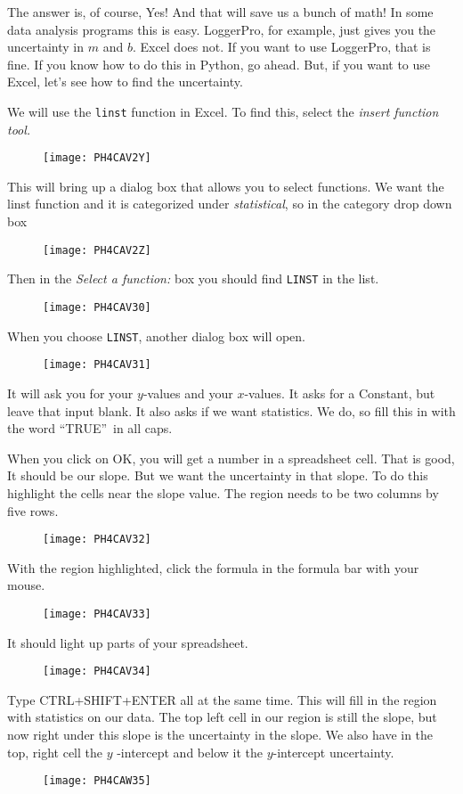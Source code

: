 The answer is, of course, Yes! And that will save us a bunch of math! In
some data analysis programs this is easy. LoggerPro, for example, just gives
you the uncertainty in $m$ and $b.$ Excel does not. If you want to use
LoggerPro, that is fine. If you know how to do this in Python, go ahead.
But, if you want to use Excel, let's see how to find the uncertainty.

We will use the \texttt{linst} function in Excel. To find this, select the 
\emph{insert function tool.}

\begin{figure}[h!]
\texttt{[image: PH4CAV2Y]}
\end{figure}This will bring up a dialog box
that allows you to select functions. We want the linst function and it is
categorized under \emph{statistical}, so in the category drop down box 
\begin{figure}[h!]
\texttt{[image: PH4CAV2Z]}
\end{figure}Then in the \emph{Select a
function:} box you should find \texttt{LINST} in the list.\begin{figure}[h!]
\texttt{[image: PH4CAV30]}
\end{figure}%
When you choose \texttt{LINST}, another dialog box will open.\begin{figure}[h!]
\texttt{[image: PH4CAV31]}
\end{figure}
It will ask you for your $y$-values and your $x$-values. It asks for a
Constant, but leave that input blank. It also asks if we want statistics. We
do, so fill this in with the word \textquotedblleft TRUE\textquotedblright\
in all caps.

When you click on OK, you will get a number in a spreadsheet cell. That is
good, It should be our slope. But we want the uncertainty in that slope. To
do this highlight the cells near the slope value. The region needs to be two
columns by five rows. \begin{figure}[h!]
\texttt{[image: PH4CAV32]}
\end{figure}With the region highlighted,
click the formula in the formula bar with your mouse.\begin{figure}[h!]
\texttt{[image: PH4CAV33]}
\end{figure} It should light up parts of your
spreadsheet. \begin{figure}[h!]
\texttt{[image: PH4CAV34]}
\end{figure}Type CTRL+SHIFT+ENTER all at the
same time. This will fill in the region with statistics on our data. The top
left cell in our region is still the slope, but now right under this slope
is the uncertainty in the slope. We also have in the top, right cell the $y$%
-intercept and below it the $y$-intercept uncertainty. \begin{figure}[h!]
\texttt{[image: PH4CAW35]}
\end{figure}

